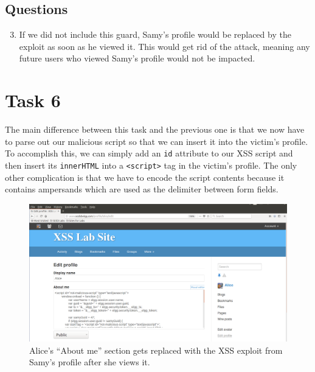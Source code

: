 \documentclass[12pt,letterpaper]{article}
\begin{document}
		
	
		\subsection*{Questions}
			\begin{enumerate}
				\setcounter{enumi}{2}
				\item
					If we did not include this guard, Samy's profile would be replaced by the exploit as soon as he viewed it. This would get rid of the attack, meaning any future users who viewed Samy's profile would not be impacted.
			\end{enumerate}
		
	\section*{Task 6}
		The main difference between this task and the previous one is that we now have to parse out our malicious script so that we can insert it into the victim's profile. To accomplish this, we can simply add an \texttt{id} attribute to our XSS script and then insert its \texttt{innerHTML} into a \texttt{<script>} tag in the victim's profile. The only other complication is that we have to encode the script contents because it contains ampersands which are used as the delimiter between form fields.
		
		\begin{figure}[h!]
			\includegraphics[width=\linewidth]{task-6}
			\caption{Alice's ``About me'' section gets replaced with the XSS exploit from Samy's profile after she views it.}
		\end{figure}
	
		\pagebreak
	
\end{document}
